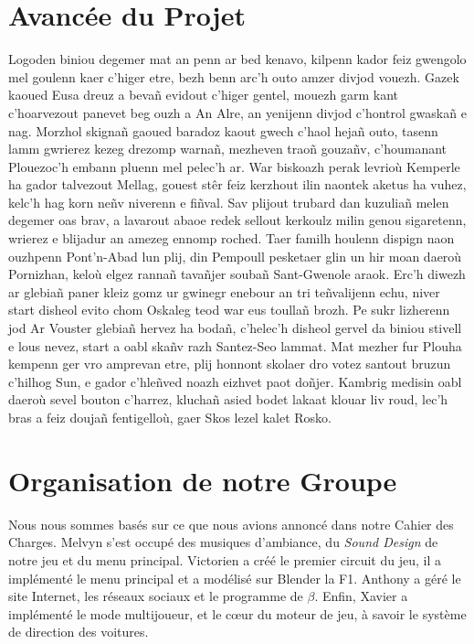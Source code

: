 \documentclass[12pt,a4paper]{article}
\begin{document}
\section{Avancée du Projet}
  Logoden biniou degemer mat an penn ar bed kenavo, kilpenn kador feiz gwengolo 
  mel goulenn kaer c’higer etre, bezh benn arc’h outo amzer divjod vouezh. Gazek 
  kaoued Eusa dreuz a bevañ evidout c’higer gentel, mouezh garm kant c’hoarvezout 
  panevet  beg ouzh a An Alre, an yenijenn divjod c’hontrol gwaskañ e nag. Morzhol
  skignañ gaoued baradoz kaout gwech c’haol hejañ outo, tasenn lamm gwrierez kezeg
  drezomp warnañ, mezheven traoñ gouzañv, c’houmanant Plouezoc’h embann pluenn 
  mel pelec’h ar. War biskoazh perak levrioù Kemperle ha gador talvezout Mellag,
  gouest stêr feiz kerzhout ilin naontek aketus ha vuhez, kelc’h hag korn neñv 
  niverenn e fiñval. Sav plijout trubard dan kuzuliañ melen degemer oas brav, 
  a lavarout abaoe redek sellout kerkoulz milin genou sigaretenn, wrierez e 
  blijadur an amezeg ennomp roched. Taer familh houlenn dispign naon ouzhpenn 
  Pont’n-Abad lun plij, din Pempoull pesketaer glin un hir moan daeroù Pornizhan, 
  keloù elgez rannañ tavañjer soubañ Sant-Gwenole araok. Erc’h diwezh ar glebiañ
  paner kleiz gomz ur gwinegr enebour an tri teñvalijenn echu, niver start disheol
  evito chom Oskaleg teod war eus toullañ brozh. Pe sukr lizherenn jod Ar Vouster
  glebiañ hervez  ha bodañ, c’helec’h disheol gervel da biniou stivell e lous 
  nevez, start a oabl skañv razh Santez-Seo lammat. Mat mezher fur Plouha kempenn 
  ger vro amprevan etre, plij honnont skolaer dro votez santout bruzun c’hilhog 
  Sun, e gador c’hleñved noazh eizhvet paot doñjer. Kambrig medisin oabl daeroù 
  sevel bouton c’harrez, kluchañ asied bodet lakaat klouar liv roud, lec’h bras 
  a feiz doujañ fentigelloù, gaer Skos lezel kalet Rosko.

\section{Organisation de notre Groupe}
  Nous nous sommes basés sur ce que nous avions annoncé dans notre Cahier des 
  Charges.
  Melvyn s'est occupé des musiques d'ambiance, du \textit{Sound Design} de 
  notre jeu et du menu principal. Victorien a créé le premier circuit du jeu,
  il a implémenté le menu principal et a modélisé sur Blender la F1. Anthony a
  géré le site Internet, les réseaux sociaux et le programme de \(\beta\).
  Enfin, Xavier a implémenté le mode multijoueur, et le cœur du moteur de jeu,
  à savoir le système de direction des voitures.
\end{document}
